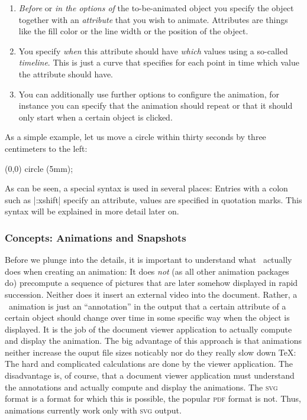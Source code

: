 \begin{enumerate}
\item \emph{Before} or \emph{in the options of} the to-be-animated
  object you specify the object together with an \emph{attribute}
  that you wish to animate. Attributes are things like the fill color
  or the line width or the position of the object.
\item You specify \emph{when} this attribute should have \emph{which}
  values using a so-called \emph{timeline}. This is just a curve that
  specifies for each point in time which value the attribute should
  have.
\item You can additionally use further options to configure
  the animation, for instance you can specify that the animation
  should repeat or that it should only start when a certain object is
  clicked. 
\end{enumerate}

As a simple example, let us move a circle within thirty seconds by three
centimeters to the left:

\begin{codeexample}[width=2cm]
\tikz \draw [animate me = {:xshift = {0s = "0cm", 30s = "-3cm"}}] (0,0) circle (5mm);
\end{codeexample}

As can be seen, a special syntax is used in several places: Entries
with a colon such as |:xshift| specify an attribute, values
are specified in quotation marks. This syntax will be explained in 
more detail later on. 


\subsubsection{Concepts: Animations and Snapshots}

Before we plunge into the details, it is important to understand what
\tikzname\ actually does when creating an animation: It does
\emph{not} (as all other animation packages do) precompute a sequence of
pictures that are later somehow displayed in rapid succession. Neither
does it insert an external video into the document. Rather, a
\tikzname\ animation is just an ``annotation'' in the output that a
certain attribute of a certain object should change over time in some
specific way when the object is displayed. It is the job of the
document viewer application to actually compute and display the
animation. The big advantage of this approach is that animations neither
increase the ouput file sizes noticably nor do they really slow down
\TeX: The hard and complicated calculations are done by the viewer
application. The disadvantage is, of course, that a document viewer
application must understand the annotations and actually compute and
display the animations. The \textsc{svg} format is a format for which
this is possible, the popular \textsc{pdf} format is not. Thus,
animations currently work only with \textsc{svg} output.

